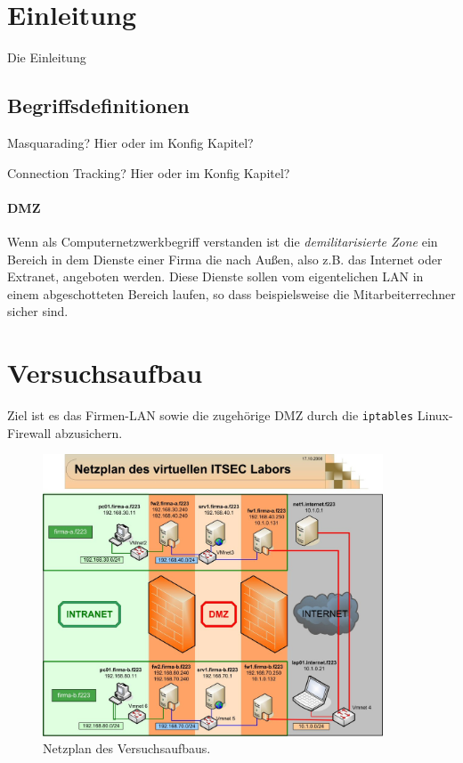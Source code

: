 \section{Einleitung}

Die Einleitung \cite{iptables}

\subsection{Begriffsdefinitionen}

Masquarading? Hier oder im Konfig Kapitel?

Connection Tracking? Hier oder im Konfig Kapitel?

\paragraph{DMZ}
Wenn als Computernetzwerkbegriff verstanden ist die
\emph{demilitarisierte Zone} ein Bereich in dem Dienste einer Firma die nach Außen,
also z.B. das Internet oder Extranet, angeboten werden. Diese Dienste sollen
vom eigentelichen LAN in einem abgeschotteten Bereich laufen, so dass
beispielsweise die Mitarbeiterrechner sicher sind.


\section{Versuchsaufbau}

Ziel ist es das Firmen-LAN sowie die zugehörige DMZ durch die
{\tt iptables} Linux-Firewall abzusichern.

\begin{figure}[h!]
  \centering
    \includegraphics[width=0.9\textwidth]{figures/Netzplan.jpg}
  \caption{Netzplan des Versuchsaufbaus.\cite{labor}}
  \label{fig.netzplan}
\end{figure}


